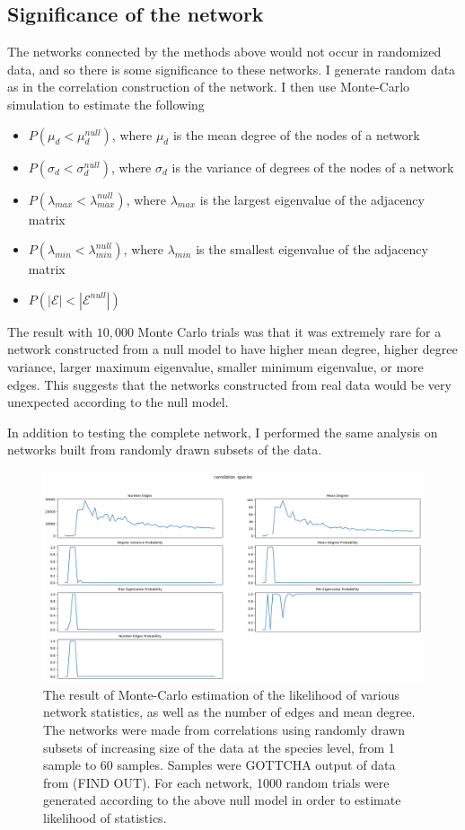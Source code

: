 \documentclass[10pt]{article}
\theoremstyle{definition}
\numberwithin{theorem}{section}
\numberwithin{definition}{section}
\numberwithin{lemma}{section}
\numberwithin{corollary}{section}
\numberwithin{clm}{section}
\numberwithin{rmk}{section}
\newcommand{\cE}{\mathcal{E}}
\begin{document}
\subsection{Significance of the network}\label{sig}
The networks connected by the methods above would not occur in randomized data, and so there is some significance to these networks. I generate random data as in the correlation construction of the network. I then use Monte-Carlo simulation to estimate the following
\begin{itemize}
	\item $P(\mu_d < \mu_d^{null})$, where $\mu_d$ is the mean degree of the nodes of a network
	\item $P(\sigma_d < \sigma_d^{null})$, where $\sigma_d$ is the variance of degrees of the nodes of a network
	\item $P(\lambda_{max} < \lambda_{max}^{null})$, where $\lambda_{max}$ is the largest eigenvalue of the adjacency matrix
	\item $P(\lambda_{min} < \lambda_{min}^{null})$, where $\lambda_{min}$ is the smallest eigenvalue of the adjacency matrix
	\item $P(|\cE| < |\cE^{null}|)$
\end{itemize} 

The result with $10,000$ Monte Carlo trials was that it was extremely rare for a network constructed from a null model to have higher mean degree, higher degree variance, larger maximum eigenvalue, smaller minimum eigenvalue, or more edges. This suggests that the networks constructed from real data would be very unexpected according to the null model. 

In addition to testing the complete network, I performed the same analysis on networks built from randomly drawn subsets of the data.

\begin{figure}
	\includegraphics[scale = 0.4]{../stat_figs/pears_1000__species.png}
	\caption{The result of Monte-Carlo estimation of the likelihood of various network statistics, as well as the number of edges and mean degree. The networks were made from correlations using randomly drawn subsets of increasing size of the data at the species level, from 1 sample to 60 samples. Samples were GOTTCHA output of data from (FIND OUT). For each network, 1000 random trials were generated according to the above null model in order to estimate likelihood of statistics.}\label{montecarlos}
\end{figure}
\end{document}
